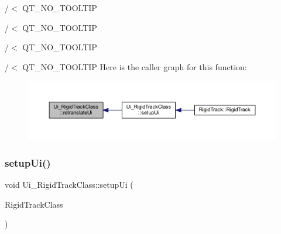 /$<$ Q\+T\+\_\+\+N\+O\+\_\+\+T\+O\+O\+L\+T\+IP

/$<$ Q\+T\+\_\+\+N\+O\+\_\+\+T\+O\+O\+L\+T\+IP

/$<$ Q\+T\+\_\+\+N\+O\+\_\+\+T\+O\+O\+L\+T\+IP

/$<$ Q\+T\+\_\+\+N\+O\+\_\+\+T\+O\+O\+L\+T\+IP Here is the caller graph for this function\+:\nopagebreak
\begin{figure}[H]
\begin{center}
\leavevmode
\includegraphics[width=350pt]{class_ui___rigid_track_class_a7c96951c4e173848e7695d6bd7883af6_icgraph}
\end{center}
\end{figure}
\mbox{\label{class_ui___rigid_track_class_a7f78fefc15716049b873bef4d3450e38}} 
\subsubsection{setup\+Ui()}
{\footnotesize\ttfamily void Ui\+\_\+\+Rigid\+Track\+Class\+::setup\+Ui (\begin{DoxyParamCaption}\item[{Q\+Main\+Window $\ast$}]{Rigid\+Track\+Class }\end{DoxyParamCaption})\hspace{0.3cm}{\ttfamily [inline]}}

